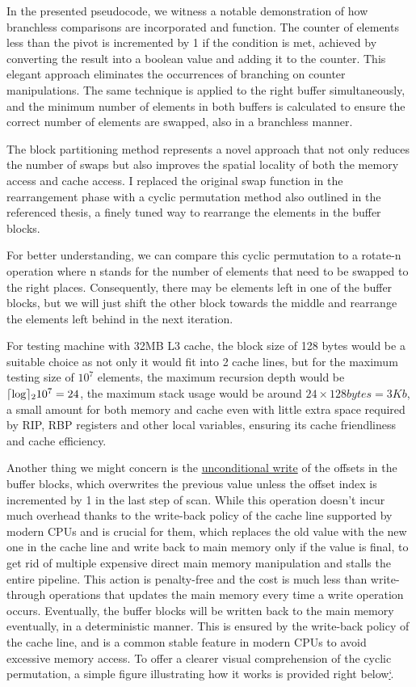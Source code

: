 \documentclass{article}
\DeclarePairedDelimiter\ceil{\lceil}{\rceil}
\begin{document}
In the presented pseudocode, we witness a notable demonstration of how branchless comparisons are incorporated and function. The counter of elements less than the pivot is incremented by 1 if the condition is met, achieved by converting the result into a boolean value and adding it to the counter. 
This elegant approach eliminates the occurrences of branching on counter manipulations. The same technique is applied to the right buffer simultaneously, and the minimum number of elements in both buffers is calculated to ensure the correct number of elements are swapped, also in a branchless manner.

The block partitioning method represents a novel approach that not only reduces the number of swaps but also improves the spatial locality of both the memory access and cache access.
I replaced the original swap function in the rearrangement phase with a cyclic permutation method also outlined in the referenced thesis, a finely tuned way to rearrange the elements in the buffer blocks.

For better understanding, we can compare this cyclic permutation to a rotate-n operation where n stands for the number of elements that need to be swapped to the right places.
Consequently, there may be elements left in one of the buffer blocks, but we will just shift the other block towards the middle and rearrange the elements left behind in the next iteration.

For testing machine with 32MB L3 cache, the block size of 128 bytes would be a suitable choice as not only it would fit into 2 cache lines, but for the maximum testing size of $10^7$ elements, the maximum recursion depth would be $\ceil\log_{2} 10^7 = 24$,
the maximum stack usage would be around $24 \times 128{bytes} = 3{Kb}$, a small amount for both memory and cache even with little extra space required by RIP, RBP registers and other local variables, ensuring its cache friendliness and cache efficiency.

Another thing we might concern is the \hyperlink{UnconditionalWrite}{unconditional write} of the offsets in the buffer blocks, which overwrites the previous value unless the offset index is incremented by 1 in the last step of scan.
While this operation doesn't incur much overhead thanks to the write-back policy of the cache line supported by modern CPUs and is crucial for them, which replaces the old value with the new one in the cache line and write back to main memory only if the value is final,
to get rid of multiple expensive direct main memory manipulation and stalls the entire pipeline. This action is penalty-free and the cost is much less than write-through operations that updates the main memory every time a write operation occurs.
Eventually, the buffer blocks will be written back to the main memory eventually, in a deterministic manner.
This is ensured by the write-back policy of the cache line, and is a common stable feature in modern CPUs to avoid excessive memory access.
To offer a clearer visual comprehension of the cyclic permutation, a simple figure illustrating how it works is provided right below\hyperlink{fig:cyclicpermu}{`}.
\end{document}
